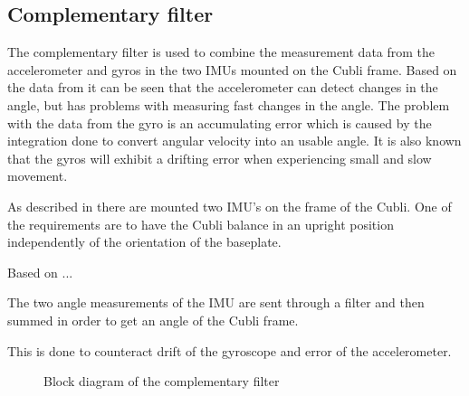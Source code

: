 \subsection{Complementary filter}
The complementary filter is used to combine the measurement data from the accelerometer and gyros in the two IMUs mounted on the Cubli frame. 
Based on the data from  it can be seen that the accelerometer can detect changes in the angle, but has problems with measuring fast changes in the angle. 
The problem with the data from the gyro is an accumulating error which is caused by the integration done to convert angular velocity into an usable angle. It is also known that the gyros will exhibit a drifting error when experiencing small and slow movement.
 
As described in  there are mounted two IMU's on the frame of the Cubli. One of the requirements are to have the Cubli balance in an upright position independently of the orientation of the baseplate.

Based on ... 

The two angle measurements of the IMU are sent through a filter and then summed in order to get an angle of the Cubli frame.
 
This is done to counteract drift of the gyroscope and error of the accelerometer. 

\begin{figure}[H]
	
	\centering
	\caption{Block diagram of the complementary filter}
	\label{blockDrawingComplementaryFilter}
\end{figure}

